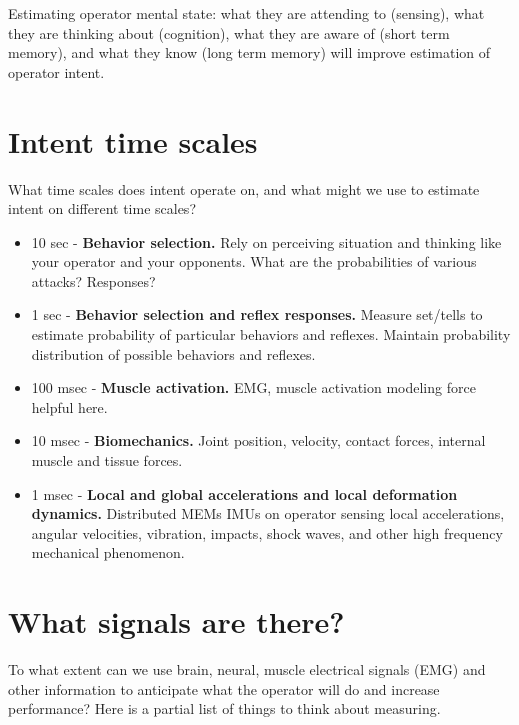 \documentclass[letterpaper,12pt,fullpage]{article}
\begin{document}
Estimating operator mental state: what they are attending to (sensing),
what they are thinking about (cognition), what they are aware of (short term
memory), and what
they know (long term memory) will improve estimation of operator intent.

\section{Intent time scales}

What time scales does intent operate on, and what might we use
to estimate intent on different time scales?

\begin{itemize}
\item
10 sec - {\bf Behavior selection.}
Rely on perceiving situation and thinking like your operator and your
opponents.
What are the probabilities of various attacks? Responses?
\item
1 sec - {\bf Behavior selection and reflex responses.}
Measure set/tells to estimate probability of particular behaviors and reflexes.
Maintain probability distribution of possible behaviors and reflexes.
\item
100 msec - {\bf Muscle activation.} EMG, muscle activation modeling
force helpful here.
\item
10 msec - {\bf Biomechanics.} Joint position, velocity, contact forces,
internal muscle and tissue forces.
\item
1 msec - {\bf Local and global accelerations and local deformation dynamics.}
Distributed MEMs IMUs on operator sensing local accelerations,
angular velocities, vibration, impacts, shock waves, and other high
frequency mechanical phenomenon.
\end{itemize}

\section{What signals are there?}

To what extent can we use brain, neural, muscle electrical signals
(EMG) and other information
to anticipate what the operator will do and increase performance?
Here is a partial list of things to think about measuring.
\end{document}
